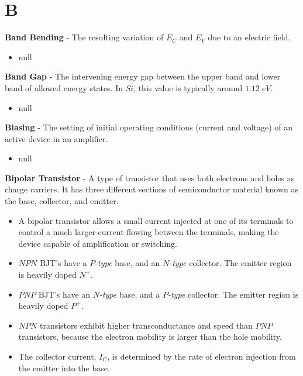 \section{B}
    \textbf{Band Bending} - The resulting variation of $E_C$ and $E_V$ due to an electric field.
    \vspace{0.15cm}
    \begin{itemize}
        \setlength\itemsep{0.5em}
        \item{null}
    \end{itemize}
\vspace{0.5cm}
    \textbf{Band Gap} - The intervening energy gap between the upper band and lower band of allowed energy states.  In $Si$, this value is typically around $1.12\;eV$.
    \vspace{0.15cm}
    \begin{itemize}
        \setlength\itemsep{0.5em}
        \item{null}
    \end{itemize}
\vspace{0.5cm}
    \textbf{Biasing} - The setting of initial operating conditions (current and voltage) of an active device in an amplifier.
    \vspace{0.15cm}
    \begin{itemize}
        \setlength\itemsep{0.5em}
        \item{null}
    \end{itemize}
\vspace{0.5cm}
    \textbf{Bipolar Transistor} - A type of transistor that uses both electrons and holes as charge carriers.  It has three different sections of semiconductor material known as the base, collector, and emitter.
    \vspace{0.15cm}
    \begin{itemize}
        \setlength\itemsep{0.5em}
        \item{A bipolar transistor allows a small current injected at one of its terminals to control a much larger current flowing between the terminals, making the device capable of amplification or switching.}
        \item{$NPN$ BJT's have a $P$\emph{-type} base, and an $N$\emph{-type} collector.  The emitter region is heavily doped $N^+$.}
        \item{$PNP$ BJT's have an $N$\emph{-type} base, and a $P$\emph{-type} collector.  The emitter region is heavily doped $P^+$.}
        \item{$NPN$ transistors exhibit higher transconductance and speed than $PNP$ transistors, because the electron mobility is larger than the hole mobility.}
        \item{The collector current, $I_C$, is determined by the rate of electron injection from the emitter into the base.}
    \end{itemize}
